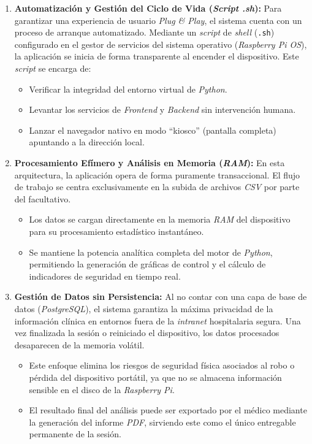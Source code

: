 \begin{enumerate}
	\item \textbf{Automatización y Gestión del Ciclo de Vida (\textit{Script .sh}):} Para garantizar una experiencia de usuario \textit{Plug \& Play}, el sistema cuenta con un proceso de arranque automatizado. Mediante un \textit{script} de \textit{shell} (\texttt{.sh})\cite{shell} configurado en el gestor de servicios del sistema operativo (\textit{Raspberry Pi OS}), la aplicación se inicia de forma transparente al encender el dispositivo. Este \textit{script} se encarga de:
	\begin{itemize}
		\item Verificar la integridad del entorno virtual de \textit{Python}.
		\item Levantar los servicios de \textit{Frontend} y \textit{Backend} sin intervención humana.
		\item Lanzar el navegador nativo en modo ``kiosco'' (pantalla completa) apuntando a la dirección local.
	\end{itemize}
	
	\item \textbf{Procesamiento Efímero y Análisis en Memoria (\textit{RAM}):} En esta arquitectura, la aplicación opera de forma puramente transaccional. El flujo de trabajo se centra exclusivamente en la subida de archivos \textit{CSV} por parte del facultativo. 
	\begin{itemize}
		\item Los datos se cargan directamente en la memoria \textit{RAM} del dispositivo para su procesamiento estadístico instantáneo.
		\item Se mantiene la potencia analítica completa del motor de \textit{Python}, permitiendo la generación de gráficas de control y el cálculo de indicadores de seguridad en tiempo real.
	\end{itemize}
	
	\item \textbf{Gestión de Datos sin Persistencia:} Al no contar con una capa de base de datos (\textit{PostgreSQL}), el sistema garantiza la máxima privacidad de la información clínica en entornos fuera de la \textit{intranet} hospitalaria segura. Una vez finalizada la sesión o reiniciado el dispositivo, los datos procesados desaparecen de la memoria volátil. 
	\begin{itemize}
		\item Este enfoque elimina los riesgos de seguridad física asociados al robo o pérdida del dispositivo portátil, ya que no se almacena información sensible en el disco de la \textit{Raspberry Pi}.
		\item El resultado final del análisis puede ser exportado por el médico mediante la generación del informe \textit{PDF}, sirviendo este como el único entregable permanente de la sesión.
	\end{itemize}
\end{enumerate}


